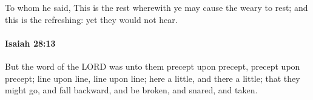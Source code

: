 			To whom he said, This is the rest wherewith ye may cause the weary to rest; and this is the refreshing: yet they would not hear.


		\paragraph{Isaiah 28:13} %
			\label{ISAIAH-28-13}

			But the word of the LORD was unto them precept upon precept, precept upon precept; line upon line, line upon line; here a little, and there a little; that they might go, and fall backward, and be broken, and snared, and taken.

